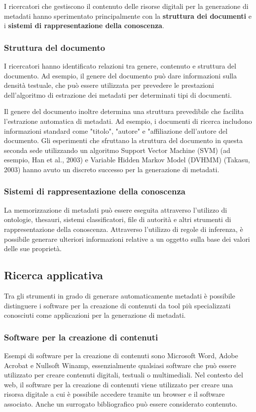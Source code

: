I ricercatori che gestiscono il contenuto delle risorse digitali per la generazione di metadati hanno sperimentato principalmente con la \textbf{struttura dei documenti} e i \textbf{sistemi di rappresentazione della conoscenza}.

\subsubsection{Struttura del documento}
I ricercatori hanno identificato relazioni tra genere, contenuto e struttura del documento. Ad esempio, il genere del documento può dare informazioni sulla densità testuale, che può essere utilizzata per prevedere le prestazioni dell'algoritmo di estrazione dei metadati per determinati tipi di documenti.

Il genere del documento inoltre determina una struttura prevedibile che facilita l'estrazione automatica di metadati. Ad esempio, i documenti di ricerca includono informazioni standard come "titolo", "autore" e "affiliazione dell'autore del documento. Gli esperimenti che sfruttano la struttura del documento in questa seconda sede utilizzando un algoritmo Support Vector Machine (SVM) (ad esempio, Han et al., 2003) e Variable Hidden Markov Model (DVHMM) (Takasu, 2003) hanno avuto un discreto successo per la generazione di metadati.

\subsubsection{Sistemi di rappresentazione della conoscenza}
La memorizzazione di metadati può essere eseguita attraverso l'utilizzo di ontologie, thesauri, sistemi classificatori, file di autorità e altri strumenti di rappresentazione della conoscenza.
Attraverso l'utilizzo di regole di inferenza, è possibile generare ulteriori informazioni relative a un oggetto sulla base dei valori delle sue proprietà.

\subsection{Ricerca applicativa}
Tra gli strumenti in grado di generare automaticamente metadati è possibile distinguere i software per la creazione di contenuti da tool più specializzati conosciuti come applicazioni per la generazione di metadati.

\subsubsection{Software per la creazione di contenuti}
Esempi di software per la creazione di contenuti sono Microsoft Word, Adobe Acrobat e Nullsoft Winamp, essenzialmente qualsiasi software che può essere utilizzato per creare contenuti digitali, testuali o multimediali. Nel contesto del web, il software per la creazione di contenuti viene utilizzato per creare una risorsa digitale a cui è possibile accedere tramite un browser e il software associato. Anche un surrogato bibliografico può essere considerato contenuto.

